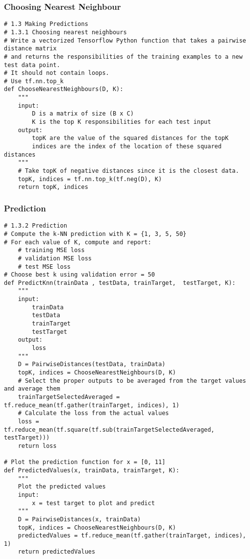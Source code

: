\documentclass[a4paper,12pt]{article}
\begin{document}
\subsubsection{Choosing Nearest Neighbour}
\begin{verbatim}
# 1.3 Making Predictions
# 1.3.1 Choosing nearest neighbours
# Write a vectorized Tensorflow Python function that takes a pairwise distance matrix
# and returns the responsibilities of the training examples to a new test data point. 
# It should not contain loops.
# Use tf.nn.top_k
def ChooseNearestNeighbours(D, K):
    """
    input:
        D is a matrix of size (B x C)
        K is the top K responsibilities for each test input
    output:
        topK are the value of the squared distances for the topK
        indices are the index of the location of these squared distances
    """
    # Take topK of negative distances since it is the closest data.
    topK, indices = tf.nn.top_k(tf.neg(D), K)
    return topK, indices
\end{verbatim}
\subsubsection{Prediction}
\begin{verbatim}
# 1.3.2 Prediction
# Compute the k-NN prediction with K = {1, 3, 5, 50}
# For each value of K, compute and report:
    # training MSE loss
    # validation MSE loss
    # test MSE loss
# Choose best k using validation error = 50
def PredictKnn(trainData , testData, trainTarget,  testTarget, K):
    """
    input:
        trainData
        testData
        trainTarget
        testTarget
    output:
        loss
    """
    D = PairwiseDistances(testData, trainData)
    topK, indices = ChooseNearestNeighbours(D, K)
    # Select the proper outputs to be averaged from the target values and average them
    trainTargetSelectedAveraged = tf.reduce_mean(tf.gather(trainTarget, indices), 1)
    # Calculate the loss from the actual values
    loss = tf.reduce_mean(tf.square(tf.sub(trainTargetSelectedAveraged, testTarget)))
    return loss

# Plot the prediction function for x = [0, 11]
def PredictedValues(x, trainData, trainTarget, K):
    """
    Plot the predicted values
    input:
        x = test target to plot and predict
    """
    D = PairwiseDistances(x, trainData)
    topK, indices = ChooseNearestNeighbours(D, K)
    predictedValues = tf.reduce_mean(tf.gather(trainTarget, indices), 1)
    return predictedValues
\end{verbatim}
\end{document}

